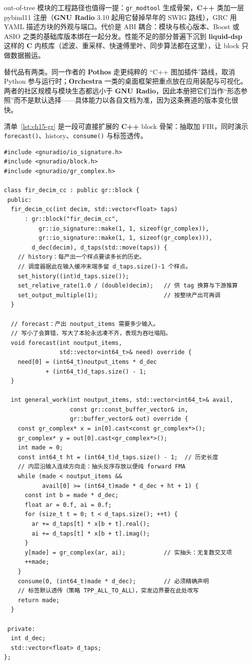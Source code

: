 \documentclass[12pt,a4paper,fontset=fandol]{ctexbook}
\newcommand{\Fn}[1]{\texttt{#1()}}
\newcommand{\Tp}[1]{\texttt{#1}}
\newcommand{\Lib}[1]{\textbf{#1}}
\newcommand{\Lang}[1]{\textsf{\bfseries #1}}
\newcommand{\CL}{\Lang{C}}
\newcommand{\CPP}{\Lang{C++}}
\begin{document}
out-of-tree 模块的工程路径也值得一提：\Tp{gr\_modtool} 生成骨架，\CPP{} 类加一层 pybind11 注册（\Lib{GNU Radio} 3.10 起用它替掉早年的 SWIG 路线），GRC 用 YAML 描述方块的外观与端口。代价是 ABI 耦合：模块与核心版本、Boost 或 ASIO 之类的基础库版本绑在一起分发。性能不足的部分普遍下沉到 \Lib{liquid-dsp} 这样的 \CL{} 内核库（滤波、重采样、快速傅里叶、同步算法都在这里），让 block 只做数据搬运。

替代品有两类。同一作者的 \Lib{Pothos} 走更纯粹的 ``C++ 图加插件''路线，取消 Python 参与运行时；\Lib{Orchestra} 一类的桌面框架把重点放在应用装配与可视化。两者的社区规模与模块生态都远小于 \Lib{GNU Radio}，因此本册把它们当作``形态参照''而不是默认选择——具体能力以各自文档为准，因为这条赛道的版本变化很快。

清单~\ref{lst:ch15-gr} 是一段可直接扩展的 \CPP{} block 骨架：抽取加 FIR，同时演示 \Fn{forecast}、history、\Fn{consume} 与标签透传。

\begin{lstlisting}[style=cppstyle,label={lst:ch15-gr},caption={GNU Radio 的 C++ block 骨架：forecast、history 与精确消耗}]
#include <gnuradio/io_signature.h>
#include <gnuradio/block.h>
#include <gnuradio/gr_complex.h>

class fir_decim_cc : public gr::block {
 public:
  fir_decim_cc(int decim, std::vector<float> taps)
      : gr::block("fir_decim_cc",
          gr::io_signature::make(1, 1, sizeof(gr_complex)),
          gr::io_signature::make(1, 1, sizeof(gr_complex))),
        d_dec(decim), d_taps(std::move(taps)) {
    // history：每产出一个样点要读多长的历史。
    // 调度器据此在输入缓冲末端多留 d_taps.size()-1 个样点。
    set_history((int)d_taps.size());
    set_relative_rate(1.0 / (double)decim);   // 供 tag 换算与下游推算
    set_output_multiple(1);                   // 按整块产出可再调
  }

  // forecast：产出 noutput_items 需要多少输入。
  // 写小了会算错，写大了本轮永远凑不齐，表现为吞吐塌陷。
  void forecast(int noutput_items,
                std::vector<int64_t>& need) override {
    need[0] = (int64_t)noutput_items * d_dec
            + (int64_t)d_taps.size() - 1;
  }

  int general_work(int noutput_items, std::vector<int64_t>& avail,
                   const gr::const_buffer_vector& in,
                   gr::buffer_vector& out) override {
    const gr_complex* x = in[0].cast<const gr_complex*>();
    gr_complex* y = out[0].cast<gr_complex*>();
    int made = 0;
    const int64_t ht = (int64_t)d_taps.size() - 1;  // 历史长度
    // 内层沿输入连续方向走：抽头反序存放以便纯 forward FMA
    while (made < noutput_items &&
           avail[0] >= (int64_t)made * d_dec + ht + 1) {
      const int b = made * d_dec;
      float ar = 0.f, ai = 0.f;
      for (size_t t = 0; t < d_taps.size(); ++t) {
        ar += d_taps[t] * x[b + t].real();
        ai += d_taps[t] * x[b + t].imag();
      }
      y[made] = gr_complex(ar, ai);           // 实抽头：无复数交叉项
      ++made;
    }
    consume(0, (int64_t)made * d_dec);        // 必须精确声明
    // 标签默认透传（策略 TPP_ALL_TO_ALL），突发边界要在此处改写
    return made;
  }

 private:
  int d_dec;
  std::vector<float> d_taps;
};
\end{lstlisting}
\end{document}
